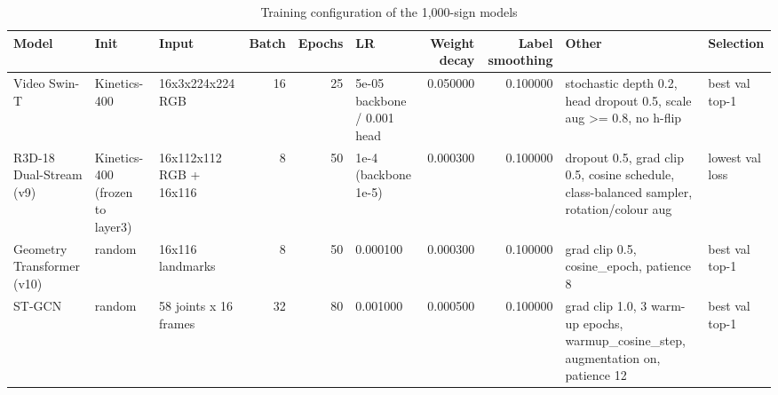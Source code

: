 \begin{table}[htbp]
\caption{Training configuration of the 1,000-sign models}
\label{tab:table03_training_hyperparameters}
\begin{tabular}{lllrrlrrll}
\toprule
Model & Init & Input & Batch & Epochs & LR & Weight decay & Label smoothing & Other & Selection \\
\midrule
Video Swin-T & Kinetics-400 & 16x3x224x224 RGB & 16 & 25 & 5e-05 backbone / 0.001 head & 0.050000 & 0.100000 & stochastic depth 0.2, head dropout 0.5, scale aug >= 0.8, no h-flip & best val top-1 \\
R3D-18 Dual-Stream (v9) & Kinetics-400 (frozen to layer3) & 16x112x112 RGB + 16x116 & 8 & 50 & 1e-4 (backbone 1e-5) & 0.000300 & 0.100000 & dropout 0.5, grad clip 0.5, cosine schedule, class-balanced sampler, rotation/colour aug & lowest val loss \\
Geometry Transformer (v10) & random & 16x116 landmarks & 8 & 50 & 0.000100 & 0.000300 & 0.100000 & grad clip 0.5, cosine\_epoch, patience 8 & best val top-1 \\
ST-GCN & random & 58 joints x 16 frames & 32 & 80 & 0.001000 & 0.000500 & 0.100000 & grad clip 1.0, 3 warm-up epochs, warmup\_cosine\_step, augmentation on, patience 12 & best val top-1 \\
\bottomrule
\end{tabular}
\end{table}
